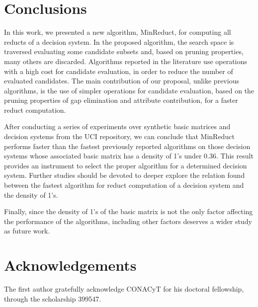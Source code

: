 \documentclass[authoryear,preprint,review,12pt]{elsarticle}
\begin{document}
	  \section{Conclusions}\label{conclusions}
	In this work, we presented a new algorithm, MinReduct, for computing all reducts of a decision system. In the proposed algorithm, the search space is traversed evaluating some candidate subsets and, based on pruning properties, many others are discarded. Algorithms reported in the literature use operations with a high cost for candidate evaluation, in order to reduce the number of evaluated candidates. The main contribution of our proposal, unlike previous algorithms, is the use of simpler operations for candidate evaluation, based on the pruning properties of gap elimination and attribute contribution, for a faster reduct computation. 
	
	After conducting a series of experiments over synthetic basic matrices and decision systems from the UCI repository, we can conclude that MinReduct performs faster than the fastest previously reported algorithms on those decision systems whose associated basic matrix has a density of 1's under 0.36. This result provides an instrument to select the proper algorithm for a determined decision system. Further studies should be devoted to deeper explore the relation found between the fastest algorithm for reduct computation of a decision system and the density of 1's. 
	
	Finally, since the density of 1's of the basic matrix is not the only factor affecting the performance of the algorithms, including other factors deserves a wider study as future work. 

\section{Acknowledgements}
	The first author gratefully acknowledge CONACyT for his doctoral fellowship, through the scholarship 399547.
\newpage 
{}

\end{document}
